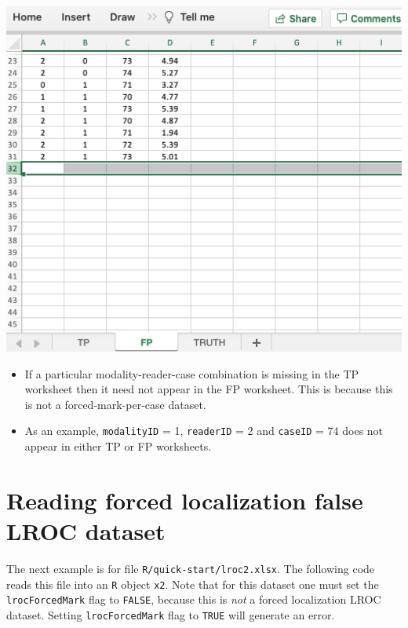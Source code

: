 \documentclass[
]{book}
\providecommand{\tightlist}{%
  \setlength{\itemsep}{0pt}\setlength{\parskip}{0pt}}
\begin{document}
\includegraphics[width=1\textwidth,height=\textheight]{images/quick-start/lroc2FP2.png}

\begin{itemize}
\tightlist
\item
  If a particular modality-reader-case combination is missing in the TP worksheet then it need not appear in the FP worksheet. This is because this is not a forced-mark-per-case dataset.
\item
  As an example, \texttt{modalityID} = 1, \texttt{readerID} = 2 and \texttt{caseID} = 74 does not appear in either TP or FP worksheets.
\end{itemize}

\hypertarget{quick-start-lroc-data-2}{%
\section{Reading forced localization false LROC dataset}\label{quick-start-lroc-data-2}}

The next example is for file \texttt{R/quick-start/lroc2.xlsx}. The following code reads this file into an \texttt{R} object \texttt{x2}. Note that for this dataset one must set the \texttt{lrocForcedMark} flag to \texttt{FALSE}, because this is \emph{not} a forced localization LROC dataset. Setting \texttt{lrocForcedMark} flag to \texttt{TRUE} will generate an error.
\end{document}
